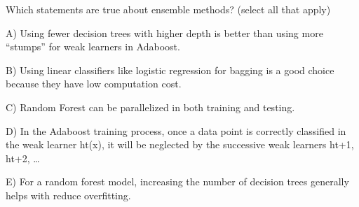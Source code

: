 Which statements are true about ensemble methods? (select all that apply)


A) Using fewer decision trees with higher depth is better than using more “stumps” for weak learners in Adaboost.


B) Using linear classifiers like logistic regression for bagging is a good choice because they have low computation cost.


C) Random Forest can be parallelized in both training and testing.


D) In the Adaboost training process, once a data point is correctly classified in the weak learner ht(x), it will be neglected by the successive weak learners ht+1, ht+2, …


E) For a random forest model, increasing the number of decision trees generally helps with reduce overfitting.
